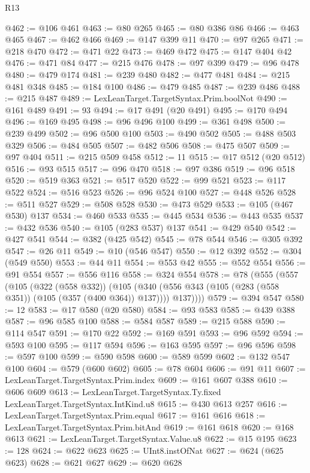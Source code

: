 \begin{lexlean}{R13}
\begin{coremodule}
@462 := @106 @461
@463 := @80 @265
@465 := @80 @386 @86
@466 := @463 @465
@467 := @462 @466
@469 := @147 @399 @11
@470 := @97 @265
@471 := @218 @470
@472 := @471 @22
@473 := @469 @472
@475 := @147 @404 @42
@476 := @471 @84
@477 := @215 @476
@478 := @97 @399
@479 := @96 @478
@480 := @479 @174
@481 := @239 @480
@482 := @477 @481
@484 := @215 @481 @348
@485 := @184 @100
@486 := @479 @485
@487 := @239 @486
@488 := @215 @487
@489 := LexLeanTarget.TargetSyntax.Prim.boolNot
@490 := @161 @489
@491 := 93
@494 := @17 @491 (@20 @491)
@495 := @170 @494
@496 := @169 @495
@498 := @96 @496 @100
@499 := @361 @498
@500 := @239 @499
@502 := @96 @500 @100
@503 := @490 @502
@505 := @488 @503 @329
@506 := @484 @505
@507 := @482 @506
@508 := @475 @507
@509 := @97 @404
@511 := @215 @509 @458
@512 := 11
@515 := @17 @512 (@20 @512)
@516 := @93 @515
@517 := @96 @470
@518 := @97 @386
@519 := @96 @518
@520 := @519 @363
@521 := @517 @520
@522 := @99 @521
@523 := @117 @522
@524 := @516 @523
@526 := @96 @524 @100
@527 := @448 @526
@528 := @511 @527
@529 := @508 @528
@530 := @473 @529
@533 := @105 (@467 @530) @137
@534 := @460 @533
@535 := @445 @534
@536 := @443 @535
@537 := @432 @536
@540 := @105 (@283 @537) @137
@541 := @429 @540
@542 := @427 @541
@544 := @382 (@425 @542)
@545 := @78 @544
@546 := @305 @392
@547 := @26 @11
@549 := @10 (@546 @547)
@550 := @12 @392
@552 := @304 (@549 @550)
@553 := @44 @11
@554 := @553 @42
@555 := @552 @554
@556 := @91 @554
@557 := @556 @116
@558 := @324 @554
@578 := @78
    (@555
      (@557
        (@105
          (@322 (@558 @332))
          (@105 (@340 (@556 @343 (@105 (@283 (@558 @351)) (@105 (@357 (@400 @364)) @137)))) @137))))
@579 := @394 @547
@580 := 12
@583 := @17 @580 (@20 @580)
@584 := @93 @583
@585 := @439 @388
@587 := @96 @585 @100
@588 := @584 @587
@589 := @215 @588
@590 := @114 @547
@591 := @170 @22
@592 := @169 @591
@593 := @96 @592
@594 := @593 @100
@595 := @117 @594
@596 := @163 @595
@597 := @96 @596
@598 := @597 @100
@599 := @590 @598
@600 := @589 @599
@602 := @132 @547 @100
@604 := @579 (@600 @602)
@605 := @78 @604
@606 := @91 @11
@607 := LexLeanTarget.TargetSyntax.Prim.index
@609 := @161 @607 @388
@610 := @606 @609
@613 := LexLeanTarget.TargetSyntax.Ty.fixed LexLeanTarget.TargetSyntax.IntKind.u8
@615 := @430 @613 @257
@616 := LexLeanTarget.TargetSyntax.Prim.equal
@617 := @161 @616
@618 := LexLeanTarget.TargetSyntax.Prim.bitAnd
@619 := @161 @618
@620 := @168 @613
@621 := LexLeanTarget.TargetSyntax.Value.u8
@622 := @15 @195
@623 := 128
@624 := @622 @623
@625 := UInt8.instOfNat
@627 := @624 (@625 @623)
@628 := @621 @627
@629 := @620 @628

\end{coremodule}
\end{lexlean}

